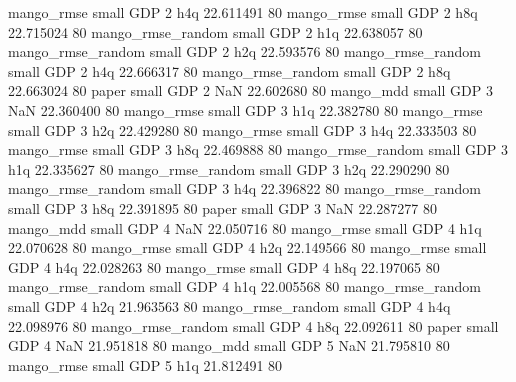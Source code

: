        mango_rmse      small      GDP                 2                  h4q 22.611491 80
       mango_rmse      small      GDP                 2                  h8q 22.715024 80
mango_rmse_random      small      GDP                 2                  h1q 22.638057 80
mango_rmse_random      small      GDP                 2                  h2q 22.593576 80
mango_rmse_random      small      GDP                 2                  h4q 22.666317 80
mango_rmse_random      small      GDP                 2                  h8q 22.663024 80
            paper      small      GDP                 2                  NaN 22.602680 80
        mango_mdd      small      GDP                 3                  NaN 22.360400 80
       mango_rmse      small      GDP                 3                  h1q 22.382780 80
       mango_rmse      small      GDP                 3                  h2q 22.429280 80
       mango_rmse      small      GDP                 3                  h4q 22.333503 80
       mango_rmse      small      GDP                 3                  h8q 22.469888 80
mango_rmse_random      small      GDP                 3                  h1q 22.335627 80
mango_rmse_random      small      GDP                 3                  h2q 22.290290 80
mango_rmse_random      small      GDP                 3                  h4q 22.396822 80
mango_rmse_random      small      GDP                 3                  h8q 22.391895 80
            paper      small      GDP                 3                  NaN 22.287277 80
        mango_mdd      small      GDP                 4                  NaN 22.050716 80
       mango_rmse      small      GDP                 4                  h1q 22.070628 80
       mango_rmse      small      GDP                 4                  h2q 22.149566 80
       mango_rmse      small      GDP                 4                  h4q 22.028263 80
       mango_rmse      small      GDP                 4                  h8q 22.197065 80
mango_rmse_random      small      GDP                 4                  h1q 22.005568 80
mango_rmse_random      small      GDP                 4                  h2q 21.963563 80
mango_rmse_random      small      GDP                 4                  h4q 22.098976 80
mango_rmse_random      small      GDP                 4                  h8q 22.092611 80
            paper      small      GDP                 4                  NaN 21.951818 80
        mango_mdd      small      GDP                 5                  NaN 21.795810 80
       mango_rmse      small      GDP                 5                  h1q 21.812491 80
